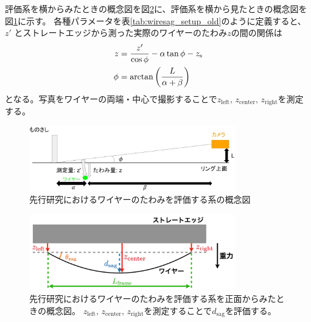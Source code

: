 \documentclass[../../main.tex]{subfiles}
\begin{document}
評価系を横からみたときの概念図を図\ref{fig:wiresag_setup_front_old}に、評価系を横から見たときの概念図を図\ref{fig:wiresag_setup_side_old}に示す。
各種パラメータを表\ref{tab:wiresag_setup_old}のように定義すると、$z'$ とストレートエッジから測った実際のワイヤーのたわみ$z$の間の関係は
\begin{align}
    z &= \dfrac{z'}{\cos\phi} - \alpha\tan\phi - z_{\mathrm{s}} \\
    \phi &= \arctan\qty(\dfrac{L}{\alpha+\beta})
\end{align}
となる。写真をワイヤーの両端・中心で撮影することで$z_\mathrm{left},\,z_\mathrm{center},\,z_\mathrm{right}$を測定する。
\begin{figure}[H]
    \centering
    \includegraphics[width=0.8\textwidth]{wiregrid/wiresag_setup_old.pdf}
    \caption{先行研究におけるワイヤーのたわみを評価する系の概念図\cite{swg:murata}}
    \label{fig:wiresag_setup_side_old}
\end{figure}
\begin{figure}[H]
    \centering
    \includegraphics[width=0.8\textwidth]{wiresag/wiresag_setup_front_old.pdf}
    \caption{先行研究におけるワイヤーのたわみを評価する系を正面からみたときの概念図。
    $z_\mathrm{left},\,z_\mathrm{center},\,z_\mathrm{right}$を測定することで$d_{\mathrm{sag}}$を評価する。}
    \label{fig:wiresag_setup_front_old}
\end{figure}
\end{document}
